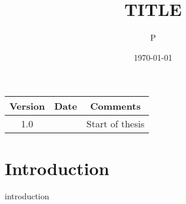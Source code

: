 \documentclass[parskip=full,11pt,a4paper,titlepage]{article}
\title{TITLE}
\author{P}
\date{\today}
\begin{document}



\clearpage

\begin{center}
\begin{tabular}{|c|c|c|}
\hline
	Version	& Date & Comments \\
\hline
	1.0		& 	 & Start of thesis \\
\hline
\end{tabular}
\end{center}
\clearpage


\tableofcontents
\clearpage

\section{Introduction}
{introduction}
\clearpage











\end{document}
